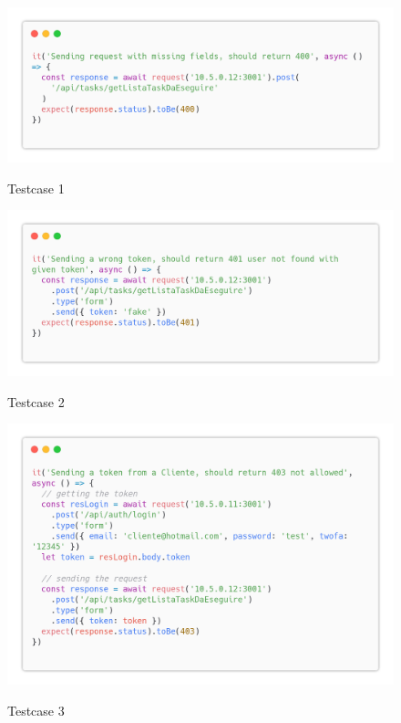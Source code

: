 \documentclass{report}
\begin{document}
\begin{figure}[H]
	\centering\includegraphics[width=1\textwidth]{images/code_da_eseguire_test1.png}
	
	Testcase 1
\end{figure}
\begin{figure}[H]
	\centering\includegraphics[width=1\textwidth]{images/code_da_eseguire_test2.png}
	
	Testcase 2
\end{figure}
\begin{figure}[H]
	\centering\includegraphics[width=1\textwidth]{images/code_da_eseguire_test3.png}
	
	Testcase 3
\end{figure}
\end{document}
